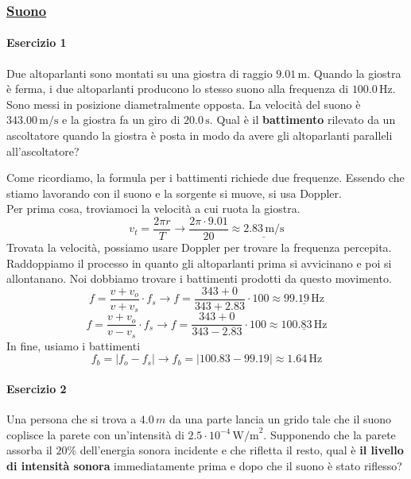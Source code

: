 \subsubsection*{\hyperref[subsec:onde:suono]{Suono}}\label{ex:suono}

\paragraph{Esercizio 1}
Due altoparlanti sono montati su una giostra di raggio $9.01\,\text{m}$. Quando la giostra è ferma, i 
due altoparlanti producono lo stesso suono alla frequenza di $100.0\,\text{Hz}$. Sono messi in 
posizione diametralmente opposta. La velocità del suono è $343.00\,\text{m/s}$ e la giostra fa un 
giro di $20.0\,\text{s}$. Qual è il \textbf{battimento} rilevato da un ascoltatore quando la giostra 
è posta in modo da avere gli altoparlanti paralleli all'ascoltatore?
\divisor

Come ricordiamo, la formula per i battimenti richiede due frequenze. Essendo che stiamo lavorando 
con il suono e la sorgente si muove, si usa Doppler.\\
Per prima cosa, troviamoci la velocità a cui ruota la giostra.
\begin{equation*}
v_t = \frac{2\pi r}{T} \rightarrow \frac{2\pi\cdot 9.01}{20} \approx \underline{2.83\,\text{m/s}}
\end{equation*}
Trovata la velocità, possiamo usare Doppler per trovare la frequenza percepita. Raddoppiamo il 
processo in quanto gli altoparlanti prima si avvicinano e poi si allontanano. Noi dobbiamo trovare
i battimenti prodotti da questo movimento.
\begin{equation*}
f = \frac{v + v_o}{v + v_s}\cdot f_s \rightarrow f = \frac{343+0}{343+2.83}\cdot 100
\approx\underline{99.19\,\text{Hz}}
\end{equation*}
\begin{equation*}
f = \frac{v + v_o}{v - v_s}\cdot f_s \rightarrow f = \frac{343+0}{343-2.83}\cdot 100
\approx\underline{100.83\,\text{Hz}}
\end{equation*}
In fine, usiamo i battimenti
\begin{equation*}
f_b = \left\vert f_o - f_s \right\vert \rightarrow f_b = \left\vert 100.83-99.19 \right\vert
\approx\boxed{1.64\,\text{Hz}}
\end{equation*}


\paragraph{Esercizio 2}
Una persona che si trova a $4.0\,m$ da una parte lancia un grido tale che il suono coplisce la 
parete con un'intensità di $2.5\cdot10^{-4}\,\text{W/m}^2$. Supponendo che la parete assorba il $20\%$
dell'energia sonora incidente e che rifletta il resto, qual è \textbf{il livello di intensità 
sonora} immediatamente prima e dopo che il suono è stato riflesso?
\divisor

